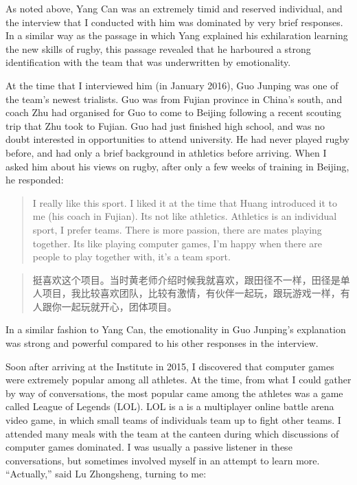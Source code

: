 \begin{CJK}{UTF8}{gbsn}
As noted above, Yang Can was an extremely timid and reserved individual, and the interview that I conducted with him was dominated by very brief responses. In a similar way as the passage in which Yang explained his exhilaration learning the new skills of rugby, this passage revealed that he harboured a strong identification with the team that was underwritten by emotionality.


At the time that I interviewed him (in January 2016), Guo Junping was one of the team's newest trialists. Guo was from Fujian province in China's south, and coach Zhu had organised for Guo to come to Beijing following a recent scouting trip that Zhu took to Fujian.  Guo had just finished high school, and was no doubt interested in opportunities to attend university. He had never played rugby before, and had only a brief background in athletics before arriving.  When I asked him about his views on rugby, after only a few weeks of training in Beijing, he responded:

  \begin{quote}
      I really like this sport.  I liked it at the time that Huang introduced it to me (his coach in Fujian). Its not like athletics.  Athletics is an individual sport, I prefer teams.  There is more passion, there are mates playing together.  Its like playing computer games, I’m happy when there are people to play together with, it's a team sport.
  \end{quote}

  \begin{quote}
    	挺喜欢这个项目。当时黄老师介绍时候我就喜欢，跟田径不一样，田径是单人项目，我比较喜欢团队，比较有激情，有伙伴一起玩，跟玩游戏一样，有人跟你一起玩就开心，团体项目。
  \end{quote}

In a similar fashion to Yang Can, the emotionality in Guo Junping's explanation was strong and powerful compared to his other responses in the interview.

Soon after arriving at the Institute in 2015, I discovered that computer games were extremely popular among all athletes.  At the time, from what I could gather by way of conversations, the most popular came among the athletes was a game called League of Legends (LOL). LOL is a is a multiplayer online battle arena video game, in which small teams of individuals team up to fight other teams.  I attended many meals with the team at the canteen during which discussions of computer games dominated. I was usually a passive listener in these conversations, but sometimes involved myself in an attempt to learn more.  ``Actually,'' said Lu Zhongsheng, turning to me:


\end{CJK}
